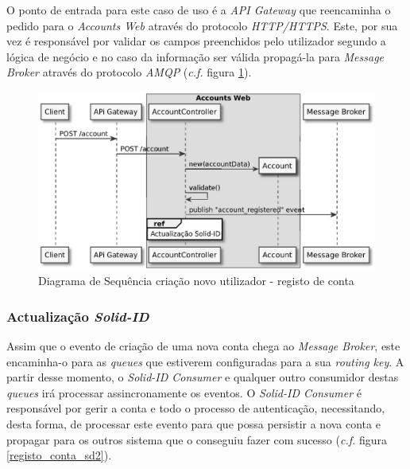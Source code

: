 O ponto de entrada para este caso de uso é a \emph{API Gateway} que reencaminha o pedido para o \emph{Accounts Web} através do protocolo \emph{HTTP/HTTPS}. Este, por sua vez é responsável por validar os campos preenchidos pelo utilizador segundo a lógica de negócio e no caso da informação ser válida propagá-la para \emph{Message Broker} através do protocolo \emph{AMQP} (\emph{c.f.} figura \ref{registo_conta_sd1}).

\begin{figure}[H]
    \begin{center}
    \includegraphics[width=1 \textwidth]{figures/create_account_sd_diagram_1.eps}
    \caption{Diagrama de Sequência criação novo utilizador - registo de conta}
    \label{registo_conta_sd1}
    \end{center}
\end{figure}

\subsubsection{Actualização \emph{Solid-ID}}

Assim que o evento de criação de uma nova conta chega ao \emph{Message Broker}, este encaminha-o para as \emph{queues} que estiverem configuradas para a sua \emph{routing key}. A partir desse momento, o \emph{Solid-ID Consumer} e qualquer outro consumidor  destas \emph{queues} irá processar assincronamente os eventos. O \emph{Solid-ID Consumer} é responsável por gerir a conta e todo o processo de autenticação, necessitando, desta forma, de processar este evento para que possa persistir a nova conta e propagar para os outros sistema que o conseguiu fazer com sucesso (\emph{c.f.} figura \ref{registo_conta_sd2}).

